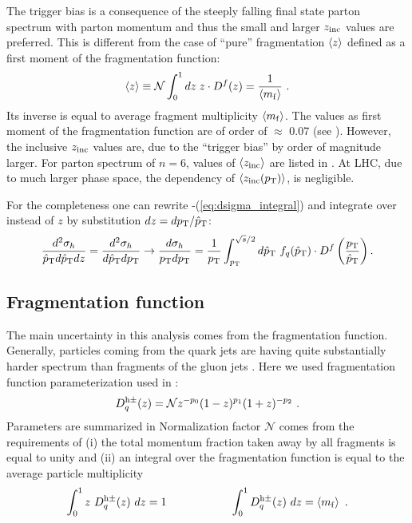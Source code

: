 \documentclass[12pt]{article}
\begin{document}
The trigger bias is a consequence of the steeply falling final state parton spectrum with parton momentum \ptq{} and thus the small \ptq{} and larger $z_{\rm inc}$ values are preferred. This is different from the case of ``pure'' fragmentation $\left< z\right>$ defined as a first moment of the fragmentation function:
\begin{equation}\label{eq:meanz}
\left< z\right> \equiv \mathcal{N}\int_0^1dz\;z\cdot D^f(z)= \frac{1}{\left< m_{\rm f}\right>}\ .
\end{equation}
Its inverse is equal to average fragment multiplicity $\left< m_{\rm f}\right>$. The  values as first moment of the fragmentation function are of order of $\approx$ 0.07 (see ). However, the inclusive $z_{\rm inc}$ values are, due to the ``trigger bias'' by order of magnitude larger. For parton spectrum of $n=6$, values of $\left< z_{\rm inc}\right>$ are listed in . At LHC, due to much 
larger phase space, the \pt{} dependency of $\left< z_{\rm inc}(p_{\rm T})\right>$,  is negligible.

For the completeness one can rewrite -(\ref{eq:dsigma_integral}) and integrate over \ptq{} instead of $z$ by substitution $dz=dp_{\rm T}/\hat{p}_{\rm T}$:
\begin{equation}
{d^2\sigma_h\over\ptq{}d\ptq{}dz}  = 
        {d^2\sigma_h\over d\ptq{}d\pt{}} 
        \rightarrow {d\sigma_h\over\pt{}d\pt{}} = 
        {1\over \pt{}} \int_{\pt{}}^{\s/2} d\ptq{}\ f_q(\ptq{})\cdot\D\left(\pt{}\over\ptq{}\right).
\end{equation}

\subsection{Fragmentation function}

The main uncertainty in this analysis comes from the fragmentation function. Generally, particles coming 
from the quark jets are having quite substantially harder spectrum than fragments of the gluon jets \cite{Delphi_Dz_EPJ00}.
Here we used fragmentation function parameterization used in \cite{Delphi_Dz_EPJ00}:
\begin{equation}\label{eq:FF}
D^{\rm h\pm}_{q}(z) = \mathcal{N} z^{-p_0}  (1-z)^{p_1} (1+z)^{-p_2} \ .
\end{equation}
Parameters are summarized in  Normalization factor $\mathcal{N}$ comes from the requirements of (i) the total momentum
fraction taken away by all fragments is equal to unity and (ii) an integral over the fragmentation function is equal to the average particle 
multiplicity
\begin{equation}\label{eq:pure_meanz}
\int_0^1z\ D^{\rm h\pm}_{q}(z)\ dz = 1\makebox[2cm]{}\int_0^1D^{\rm h\pm}_{q}(z)\ dz=\la m_{\rm f}\ra \ .
\end{equation}
\end{document}
